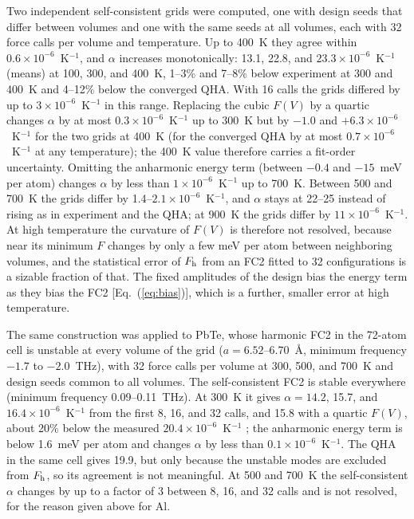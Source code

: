 \documentclass[aip,jap,reprint,amsmath,amssymb,floatfix]{revtex4-2}
\begin{document}
Two independent self-consistent grids were computed, one with design seeds
that differ between volumes and one with the same seeds at all volumes,
each with 32 force calls per volume and temperature. Up to 400~K they agree
within $0.6\times10^{-6}$~K$^{-1}$, and $\alpha$ increases monotonically:
13.1, 22.8, and $23.3\times10^{-6}$~K$^{-1}$ (means) at 100, 300, and 400~K,
1--3\% and 7--8\% below experiment at 300 and 400~K and 4--12\% below the
converged QHA. With 16 calls the grids differed by up to
$3\times10^{-6}$~K$^{-1}$ in this range. Replacing the cubic $F(V)$ by a
quartic changes $\alpha$ by at most $0.3\times10^{-6}$~K$^{-1}$ up to 300~K
but by $-1.0$ and $+6.3\times10^{-6}$~K$^{-1}$ for the two grids at 400~K
(for the converged QHA by at most $0.7\times10^{-6}$~K$^{-1}$ at any
temperature); the 400~K value therefore carries a fit-order uncertainty.
Omitting the anharmonic energy term (between $-0.4$ and $-15$~meV per
atom) changes $\alpha$ by less than $1\times10^{-6}$~K$^{-1}$ up to 700~K. Between
500 and 700~K the grids differ by 1.4--$2.1\times10^{-6}$~K$^{-1}$, and
$\alpha$ stays at 22--25 instead of rising as in experiment and the QHA;
at 900~K the grids differ by $11\times10^{-6}$~K$^{-1}$. At high
temperature the curvature of $F(V)$ is therefore not resolved, because
near its minimum $F$ changes by only a few meV per atom between neighboring
volumes, and the statistical error of $F_{\rm h}$ from an FC2 fitted to 32
configurations is a sizable fraction of that. The fixed amplitudes of the design bias the energy term
as they bias the FC2 [Eq.~(\ref{eq:bias})], which is a further, smaller
error at high temperature.

The same construction was applied to PbTe, whose harmonic FC2 in the
72-atom cell is unstable at every volume of the grid ($a=6.52$--6.70~\AA,
minimum frequency $-1.7$ to $-2.0$~THz), with 32 force calls per volume at
300, 500, and 700~K and design seeds common to all volumes. The
self-consistent FC2 is stable everywhere (minimum frequency 0.09--0.11~THz).
At 300~K it gives $\alpha=14.2$, 15.7, and $16.4\times10^{-6}$~K$^{-1}$
from the first 8, 16, and 32 calls, and 15.8 with a quartic $F(V)$, about
20\% below the measured $20.4\times10^{-6}$~K$^{-1}$
\cite{houston1968,madelung2004}; the anharmonic energy term is below
1.6~meV per atom and changes $\alpha$ by less than
$0.1\times10^{-6}$~K$^{-1}$. The QHA in the same cell gives 19.9, but only
because the unstable modes are excluded from $F_{\rm h}$, so its agreement
is not meaningful. At 500 and 700~K the self-consistent $\alpha$ changes by
up to a factor of 3 between 8, 16, and 32 calls and is not resolved, for
the reason given above for Al.
\end{document}

